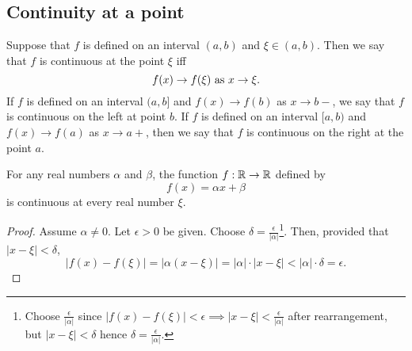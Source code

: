 \documentclass[10pt, a4paper]{article}
\begin{document}
\subsection{Continuity at a point}
Suppose that $f$ is defined on an interval $(a, b)$ and $\xi \in (a, b)$. Then we say that $f$ is continuous at the point $\xi$ iff
$$f(x) \rightarrow f(\xi) \textnormal{ as } x \rightarrow \xi.$$
If $f$ is defined on an interval $(a, b]$ and $f(x) \rightarrow f(b)$ as $x \rightarrow b-$, we say that $f$ is continuous on the left at point $b$. If $f$ is defined on an interval $[a, b)$ and $f(x) \rightarrow f(a)$ as $x \rightarrow a+$, then we say that $f$ is continuous on the right at the point $a$.

\begin{example}\label{examp_cont_monomial}
    For any real numbers $\alpha$ and $\beta$, the function $f: \mathbb{R} \rightarrow \mathbb{R}$ defined by
    $$f(x) = \alpha x + \beta$$
    is continuous at every real number $\xi$.
    \begin{proof}
        Assume $\alpha \neq 0$. Let $\epsilon > 0$ be given. Choose $\delta = \frac{\epsilon}{|\alpha|}$\footnote{Choose
        $\frac{\epsilon}{|\alpha|}$ since $|f(x) - f(\xi)| < \epsilon \implies |x - \xi| < \frac{\epsilon}{|\alpha|}$ after rearrangement, but $|x - \xi| < \delta$ hence $\delta = \frac{\epsilon}{|\alpha|}$.}. Then, provided that $|x - \xi| < \delta$,
        $$|f(x) - f(\xi)| = |\alpha(x - \xi)| = |\alpha|\cdot|x - \xi| < |\alpha|\cdot\delta = \epsilon.$$
    \end{proof}
\end{example}
\end{document}
